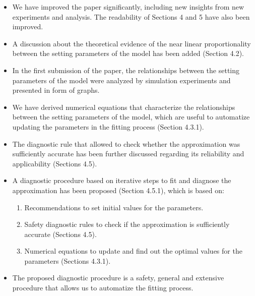 \documentclass[11pt]{report}
\begin{document}
\begin{itemize}


\item We have improved the paper significantly, including new insights from new experiments and analysis. The readability of Sections 4 and 5 have also been improved.

\item A discussion about the theoretical evidence of the near linear proportionality between the setting parameters of the model has been added (Section 4.2). 

\item In the first submission of the paper, the relationships between the setting parameters of the model were analyzed by simulation experiments and presented in form of graphs. 

\item We have derived numerical equations that characterize the relationships between the setting parameters of the model, which are useful to automatize updating the parameters in the fitting process (Section 4.3.1). 

\item The diagnostic rule that allowed to check whether the approximation was sufficiently accurate has been further discussed regarding its reliability and applicability (Sections 4.5).

\item A diagnostic procedure based on iterative steps to fit and diagnose the approximation has been proposed (Section 4.5.1), which is based on:

\begin{enumerate}
\item Recommendations to set initial values for the parameters.
\item Safety diagnostic rules to check if the approximation is sufficiently accurate (Sections 4.5).
\item Numerical equations to update and find out the optimal values for the parameters (Sections 4.3.1).
\end{enumerate}

\item The proposed diagnostic procedure is a safety, general and extensive procedure that allows us to automatize the fitting process.


\end{itemize}
\end{document}
